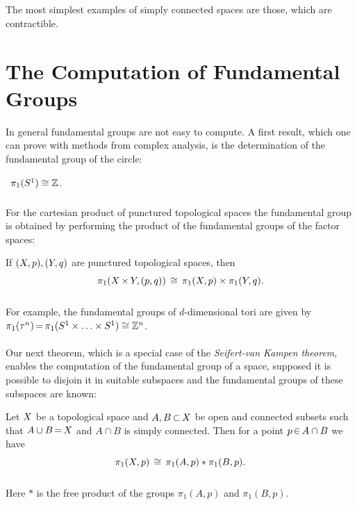 \documentclass[11pt,twoside]{article}
\begin{document}
\subparagraph{}
The most simplest examples of simply connected spaces are those,
which are contractible.

\section{The Computation of Fundamental Groups}
In general fundamental groups are not easy to compute.
A first result,
which one can prove with methods from complex analysis,
is the determination of the fundamental group of the circle:

\begin{theorem1}\,
$\pi_1(S^1) \cong {\mathbb{Z}}$.
\end{theorem1}

\subparagraph{}
For the cartesian product of punctured topological spaces
the fundamental group is obtained by performing the product of the
fundamental groups of the factor spaces:

\begin{theorem1}
If $(X,p),(Y,q)$ are punctured topological spaces,
then
\[
\pi_1( X {\,\times\,} Y, (p,q))
\, \cong \,
\pi_1(X,p) \times \pi_1(Y,q).
\]
\end{theorem1}

\subparagraph{}
For example,
the fundamental groups of $d$-dimensional tori are given by
$\pi_1(\tau^n) {\,=\,} \pi_1({S^1} \times \ldots \times {S^1}) \cong {\mathbb{Z}}^n$.

\paragraph{}
Our next theorem,
which is a special case of the \textit{Seifert-van Kampen theorem},
enables the computation of the fundamental group of a space,
supposed it is possible to disjoin it in suitable subspaces 
and the fundamental groups of these subspaces are known:

\begin{theorem1}
Let $X$ be a topological space and $A,B {\,\subset\,} X$
be open and connected subsets
such that
$A \cup B {\,=\,} X$ and $A \cap B$ is simply connected.
Then for a point $p {\,\in\,} A \cap B$ we have
\[
\pi_1(X,p) \, \cong \, \pi_1(A,p) \ast \pi_1(B,p).
\]
\end{theorem1}

\subparagraph{}
Here $\ast$ is the free product of the groups $\pi_1(A,p)$ and $\pi_1(B,p)$.
\end{document}
